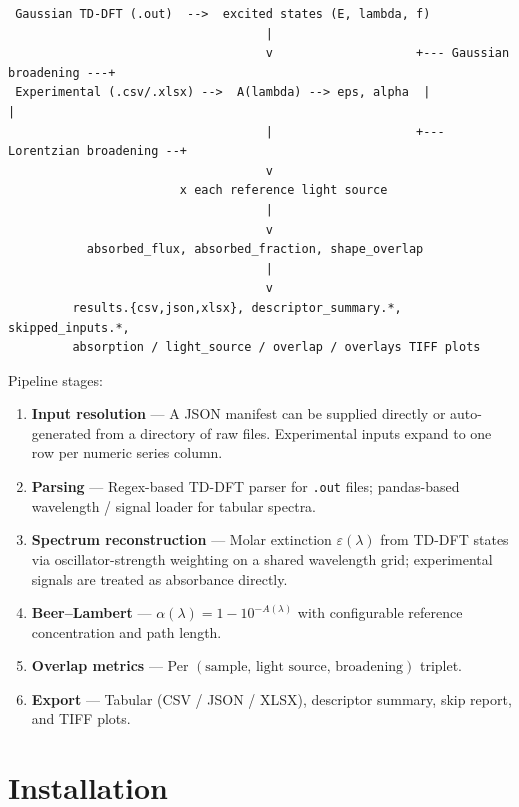\documentclass[11pt,a4paper]{article}
\begin{document}
\begin{lstlisting}
 Gaussian TD-DFT (.out)  -->  excited states (E, lambda, f)
                                    |
                                    v                    +--- Gaussian broadening ---+
 Experimental (.csv/.xlsx) -->  A(lambda) --> eps, alpha  |                            |
                                    |                    +--- Lorentzian broadening --+
                                    v
                        x each reference light source
                                    |
                                    v
           absorbed_flux, absorbed_fraction, shape_overlap
                                    |
                                    v
         results.{csv,json,xlsx}, descriptor_summary.*, skipped_inputs.*,
         absorption / light_source / overlap / overlays TIFF plots
\end{lstlisting}

\noindent Pipeline stages:
\begin{enumerate}
  \item \textbf{Input resolution} --- A JSON manifest can be supplied
        directly or auto-generated from a directory of raw files.
        Experimental inputs expand to one row per numeric series column.
  \item \textbf{Parsing} --- Regex-based TD-DFT parser for \texttt{.out}
        files; pandas-based wavelength / signal loader for tabular
        spectra.
  \item \textbf{Spectrum reconstruction} --- Molar extinction
        \(\varepsilon(\lambda)\) from TD-DFT states via
        oscillator-strength weighting on a shared wavelength grid;
        experimental signals are treated as absorbance directly.
  \item \textbf{Beer--Lambert} ---
        \(\alpha(\lambda) = 1 - 10^{-A(\lambda)}\) with configurable
        reference concentration and path length.
  \item \textbf{Overlap metrics} --- Per
        \((\text{sample, light source, broadening})\) triplet.
  \item \textbf{Export} --- Tabular (CSV / JSON / XLSX), descriptor
        summary, skip report, and TIFF plots.
\end{enumerate}

\section{Installation}
\end{document}
